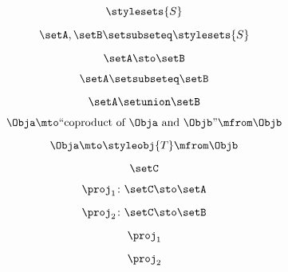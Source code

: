 {\begin{forslides}
    \begin{equation}
        \label{eq:combination-144}
        \stylesets{S}
    \end{equation}

    \begin{equation}
        \label{eq:combination-145}
        \setA,\setB\setsubseteq \stylesets{S}
    \end{equation}

    \begin{equation}
        \label{eq:combination-146}
        \setA \sto \setB
    \end{equation}

    \begin{equation}
        \label{eq:combination-147}
        \setA\setsubseteq \setB
    \end{equation}

    \begin{equation}
        \label{eq:combination-148}
        \setA\setunion\setB
    \end{equation}

    \begin{equation}
        \label{eq:combination-149}
        \Obja \mto \text{``coproduct of } \Obja \text{ and } \Objb \text{''}  \mfrom \Objb
    \end{equation}

    \begin{equation}
        \label{eq:combination-150}
        \Obja \mto \styleobj{T} \mfrom \Objb
    \end{equation}

    \begin{equation}
        \label{eq:combination-151}
        \setC
    \end{equation}

    \begin{equation}
        \label{eq:combination-152}
        \proj_1\colon \setC \sto \setA
    \end{equation}

    \begin{equation}
        \label{eq:combination-153}
        \proj_2\colon \setC \sto \setB
    \end{equation}

    \begin{equation}
        \label{eq:combination-154}
        \proj_1
    \end{equation}

    \begin{equation}
        \label{eq:combination-155}
        \proj_2
    \end{equation}


\end{forslides}}
